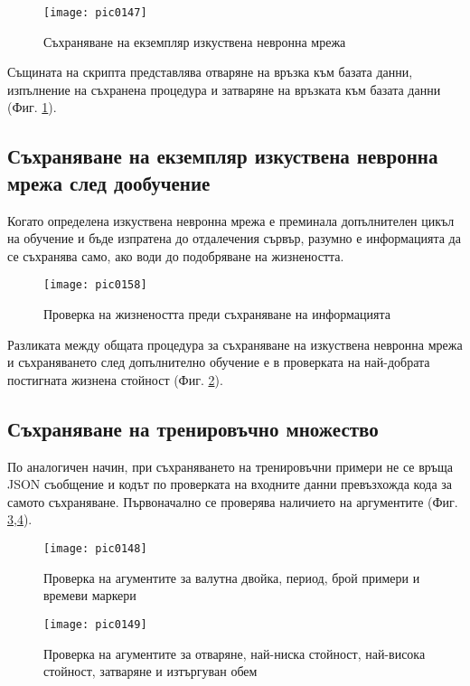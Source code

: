 \begin{figure}[h]
  \centering
  \texttt{[image: pic0147]}
  \caption{Съхраняване на екземпляр изкуствена невронна мрежа}
\label{fig:pic0147}
\end{figure}
\FloatBarrier

Същината на скрипта представлява отваряне на връзка към базата данни, изпълнение на съхранена процедура и затваряне на връзката към базата данни (Фиг. \ref{fig:pic0147}).

\subsection{Съхраняване на екземпляр изкуствена невронна мрежа след дообучение}

Когато определена изкуствена невронна мрежа е преминала допълнителен цикъл на обучение и бъде изпратена до отдалечения сървър, разумно е информацията да се съхранява само, ако води до подобряване на жизнеността. 

\begin{figure}[h]
  \centering
  \texttt{[image: pic0158]}
  \caption{Проверка на жизнеността преди съхраняване на информацията}
\label{fig:pic0158}
\end{figure}
\FloatBarrier

Разликата между общата процедура за съхраняване на изкуствена невронна мрежа и съхраняването след допълнително обучение е в проверката на най-добрата постигната жизнена стойност (Фиг. \ref{fig:pic0158}).

\subsection{Съхраняване на тренировъчно множество}

По аналогичен начин, при съхраняването на тренировъчни примери не се връща JSON съобщение и кодът по проверката на входните данни превъзхожда кода за самото съхраняване. Първоначално се проверява наличието на аргументите (Фиг. \ref{fig:pic0148},\ref{fig:pic0149}).

\begin{figure}[h]
  \centering
  \texttt{[image: pic0148]}
  \caption{Проверка на агументите за валутна двойка, период, брой примери и времеви маркери}
\label{fig:pic0148}
\end{figure}
\FloatBarrier

\begin{figure}[h]
  \centering
  \texttt{[image: pic0149]}
  \caption{Проверка на агументите за отваряне, най-ниска стойност, най-висока стойност, затваряне и изтъргуван обем}
\label{fig:pic0149}
\end{figure}
\FloatBarrier


